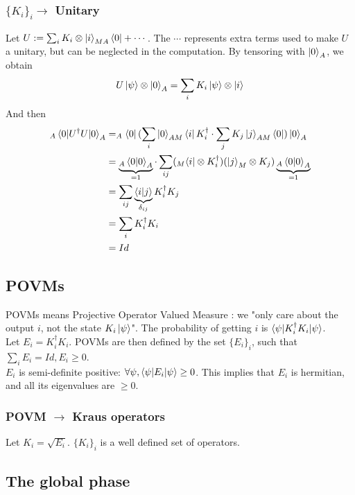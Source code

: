 \documentclass{article}
\begin{document}
\subsubsection*{$\{K_i\}_i \rightarrow$ Unitary}
Let $U := \sum_i K_i \otimes \ket{i}_{MA}\bra{0} + \cdots $.
The $\cdots$ represents extra terms used to make $U$ a unitary, but can be neglected in the computation.
By tensoring with $\ket{0}_A$, we obtain
\begin{equation}
    U\ket{\psi}\otimes \ket{0}_A = \sum_i K_i \ket{\psi}\otimes\ket{i}
\end{equation}
And then
\begin{equation}
    \begin{aligned}
        _A\braket{0 |U^\dagger U|0}_A
            & = _A\bra{0}(\sum_i\ket{0}_{AM}\bra{i} K_i^\dagger \cdot \sum_j K_j\ket{j}_{AM}\bra{0})\ket{0}_A \\
            & = \underbrace{_A\braket{0|0}_A}_{=1} \cdot \sum_{ij}(_M\bra{i}\otimes K_i^\dagger)(\ket{j}_M\otimes K_j) \underbrace{_A\braket{0|0}_A}_{=1} \\
            & = \sum_{ij}\underbrace{\braket{i|j}}_{\delta_{ij}} K_i^\dagger K_j \\
            & = \sum_i K_i^\dagger K_i \\
            & = Id
    \end{aligned}
\end{equation}
\subsection{POVMs}
POVMs means Projective Operator Valued Measure :
we "only care about the output $i$, not the state $K_i\ket{\psi}$".
The probability of getting $i$ is $\braket{\psi | K_i^\dagger K_i | \psi}$.\\
Let $E_i = K_i^\dagger K_i$.
POVMs are then defined by the set $\{E_i\}_i$, such that $\sum_i E_i = Id, E_i\geq 0$.\\

$E_i$ is semi-definite positive: $ \forall \psi, \braket{\psi|E_i|\psi} \geq 0$. This implies that $E_i$ is hermitian, and all its eigenvalues are $\geq 0$.
\subsubsection*{POVM $\rightarrow$ Kraus operators}
Let $K_i = \sqrt{E_i}$. $\{K_i\}_i$ is a well defined set of operators.

\subsection{The global phase}
\end{document}
